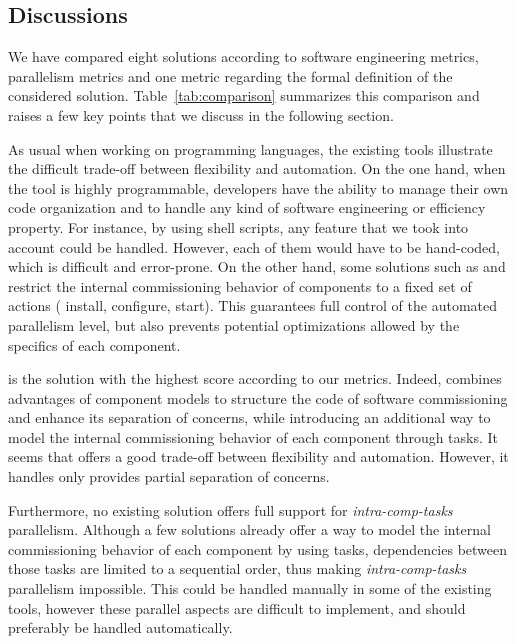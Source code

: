 \subsection{Discussions}

We have compared eight solutions according to software engineering metrics, parallelism metrics and one metric regarding the formal definition of the considered solution. Table~\ref{tab:comparison} summarizes this comparison and raises a few key points that we discuss in the following section.

As usual when working on programming languages, the existing tools
illustrate the difficult trade-off between flexibility and
automation. On the one hand, when the tool is highly programmable,
developers have the ability to manage their own code organization and
to handle any kind of software engineering or efficiency property. For
instance, by using shell scripts, any feature that we took into
account could be handled. However, each of them would have to be
hand-coded, which is difficult and error-prone. On the other hand,
some solutions such as \deployware and \juju restrict the internal
commissioning behavior of components to a fixed set of actions (\eg
install, configure, start). This guarantees full control of the
automated parallelism level, but also prevents potential optimizations
allowed by the specifics of each component.

\aeolus is the solution with the highest score according to our
metrics. Indeed, \aeolus combines advantages of component models to
structure the code of software commissioning and enhance its
separation of concerns, while introducing an additional way to model
the internal commissioning behavior of each component through
tasks. It seems that \aeolus offers a good trade-off between
flexibility and automation. However, it handles only provides partial
separation of concerns.

Furthermore, no existing solution offers full support for
\emph{intra-comp-tasks} parallelism. Although a few solutions already
offer a way to model the internal commissioning behavior of each
component by using tasks, dependencies between those tasks are limited
to a sequential order, thus making \emph{intra-comp-tasks} parallelism
impossible. This could be handled manually in some of the existing
tools, however these parallel aspects are difficult to implement, and
should preferably be handled automatically.


